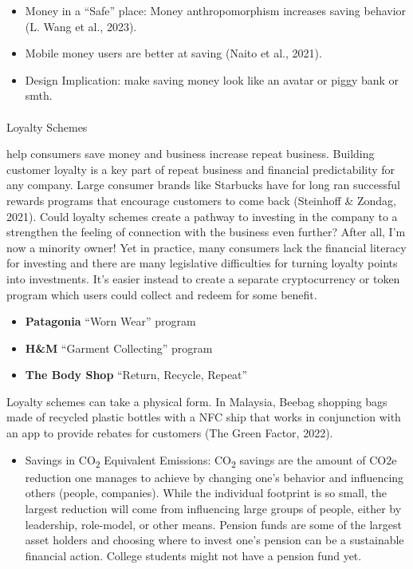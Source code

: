 \documentclass[
  letterpaper,
  DIV=11,
  numbers=noendperiod]{scrartcl}
\makeatletter
\let\oldparagraph\paragraph
\renewcommand{\paragraph}{
    \@ifstar
      \xxxParagraphStar
      \xxxParagraphNoStar
  }
\newcommand{\xxxParagraphStar}[1]{\oldparagraph*{#1}\mbox{}}
\newcommand{\xxxParagraphNoStar}[1]{\oldparagraph{#1}\mbox{}}
\providecommand{\tightlist}{%
  \setlength{\itemsep}{0pt}\setlength{\parskip}{0pt}}\usepackage{longtable,booktabs,array}
\makeatother
\begin{document}
\begin{itemize}
\item
  Money in a ``Safe'' place: Money anthropomorphism increases saving
  behavior (L. Wang et al., 2023).
\item
  Mobile money users are better at saving (Naito et al., 2021).
\item
  Design Implication: make saving money look like an avatar or piggy
  bank or smth.
\end{itemize}

\paragraph{Loyalty Schemes}\label{loyalty-schemes}

help consumers save money and business increase repeat business.
Building customer loyalty is a key part of repeat business and financial
predictability for any company. Large consumer brands like Starbucks
have for long ran successful rewards programs that encourage customers
to come back (Steinhoff \& Zondag, 2021). Could loyalty schemes create a
pathway to investing in the company to a strengthen the feeling of
connection with the business even further? After all, I'm now a minority
owner! Yet in practice, many consumers lack the financial literacy for
investing and there are many legislative difficulties for turning
loyalty points into investments. It's easier instead to create a
separate cryptocurrency or token program which users could collect and
redeem for some benefit.

\begin{itemize}
\item
  \textbf{Patagonia} ``Worn Wear'' program
\item
  \textbf{H\&M} ``Garment Collecting'' program
\item
  \textbf{The Body Shop} ``Return, Recycle, Repeat''
\end{itemize}

Loyalty schemes can take a physical form. In Malaysia, Beebag shopping
bags made of recycled plastic bottles with a NFC ship that works in
conjunction with an app to provide rebates for customers (The Green
Factor, 2022).

\begin{itemize}
\tightlist
\item
  Savings in CO\textsubscript{2} Equivalent Emissions:
  CO\textsubscript{2} savings are the amount of CO2e reduction one
  manages to achieve by changing one's behavior and influencing others
  (people, companies). While the individual footprint is so small, the
  largest reduction will come from influencing large groups of people,
  either by leadership, role-model, or other means. Pension funds are
  some of the largest asset holders and choosing where to invest one's
  pension can be a sustainable financial action. College students might
  not have a pension fund yet.
\end{itemize}
\end{document}
